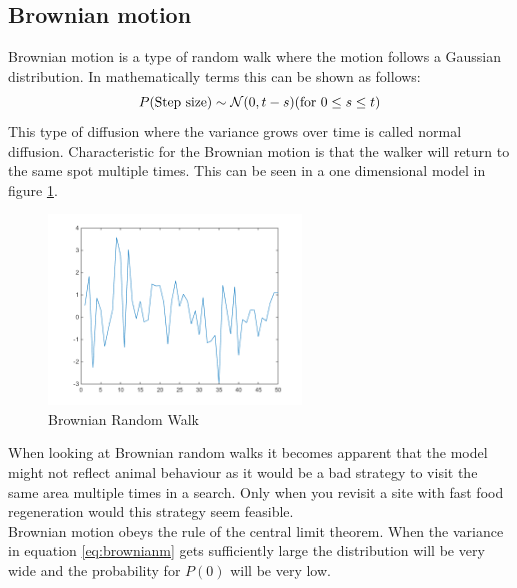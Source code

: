 \subsection{Brownian motion}
Brownian motion is a type of random walk where the motion follows a Gaussian distribution. In mathematically terms this can be shown as follows:
\begin{equation}
P($Step size$) \sim \mathcal{N}(0,t-s) ($for $ 0 \leq s \leq t)
\label{eq:brownianm}
\end{equation}
This type of diffusion where the variance grows over time is called normal diffusion. Characteristic for the Brownian motion is that the walker will return to the same spot multiple times. This can be seen in a one dimensional model in figure \ref{fig:brownianrw}.
\begin{figure}[H]
\centering
\includegraphics[width = 0.6\textwidth]{billeder/brownian}
\caption{Brownian Random Walk}
\label{fig:brownianrw}
\end{figure}
When looking at Brownian random walks it becomes apparent that the model might not reflect animal behaviour as it would be a bad strategy to visit the same area multiple times in a search. Only when you revisit a site with fast food regeneration would this strategy seem feasible.\\
Brownian motion obeys the rule of the central limit theorem. When the variance in equation \ref{eq:brownianm} gets sufficiently large the distribution will be very wide and the probability for $P(0)$ will be very low.

